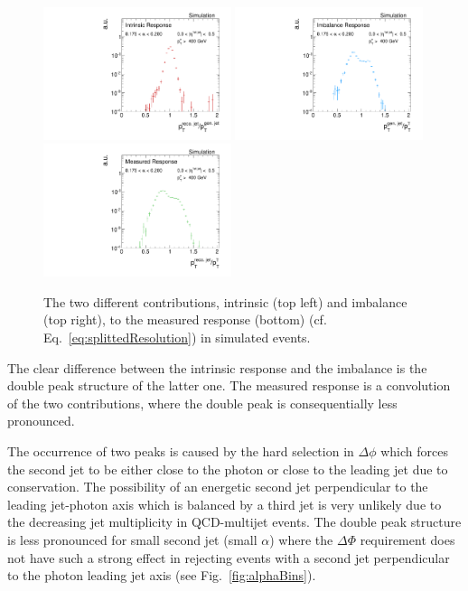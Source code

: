 \begin{figure}[t]
 \centering
     \includegraphics[width=0.49\textwidth]{figures/resolution/methodology/intrinsicResponse_6_alpha_bin.pdf}
     \includegraphics[width=0.49\textwidth]{figures/resolution/methodology/imbalanceResponse_6_alpha_bin.pdf}\\
     \includegraphics[width=0.49\textwidth]{figures/resolution/methodology/fullResponse_6_alpha_bin.pdf}
  \caption{The two different contributions, intrinsic (top left) and imbalance (top right), to the measured response (bottom) (cf. Eq.~\eqref{eq:splittedResolution}) in simulated events.}  
 \label{fig:responseExamples}
\end{figure}


The clear difference between the intrinsic response and the imbalance is the double peak structure of the latter one. The measured response is a convolution of the two
contributions, where the double peak is consequentially less pronounced.

The occurrence of two peaks is caused by the hard selection in $\Delta \phi$ which forces the second jet to be either close to the photon or close to the leading jet 
due to \pt conservation. 
The possibility of an energetic second jet perpendicular to the leading jet-photon axis which is balanced by a third jet is very unlikely 
due to the decreasing jet multiplicity in QCD-multijet events.
The double peak structure is less pronounced for small second jet \pt (small $\alpha$) where the $\Delta \Phi$ requirement does not have such a strong effect in rejecting
events with a second jet perpendicular to the photon leading jet axis (see \mbox{Fig. \ref{fig:alphaBins}}).

